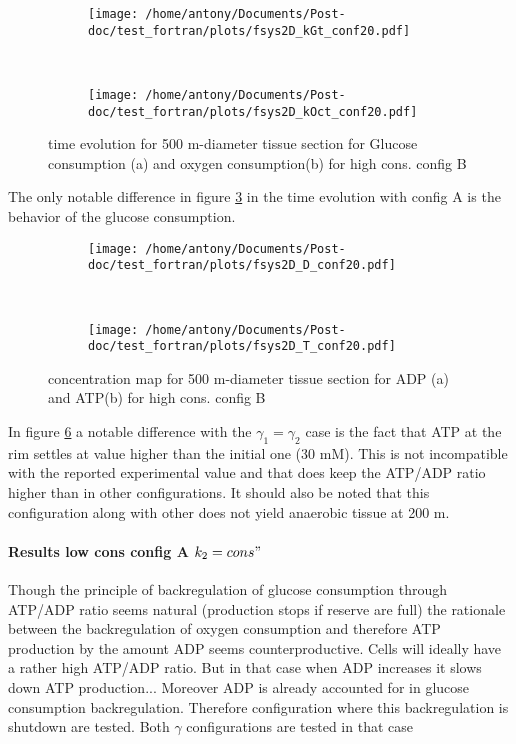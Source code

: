 \documentclass[11pt,a4paper]{article}
\begin{document}
\begin{figure}[ht!]
	\begin{subfigure}{0.45\textwidth}
	\centering
	\texttt{[image: /home/antony/Documents/Post-doc/test\_fortran/plots/fsys2D\_kGt\_conf20.pdf]}
	\caption{ \label{kGt_conf20}}
	\end{subfigure}
	~~
	\begin{subfigure}{0.45\textwidth}
	\texttt{[image: /home/antony/Documents/Post-doc/test\_fortran/plots/fsys2D\_kOct\_conf20.pdf]}
		\caption{ \label{kOct_conf20}}
	\end{subfigure}
	\caption{time evolution for 500 \textmu m-diameter tissue section  for Glucose consumption (a) and oxygen consumption(b) for high cons. config B \label{ktconf20}}
\end{figure} 

The only notable difference in figure \ref{ktconf20} in the time evolution with config A is the behavior of the glucose consumption. 

\begin{figure}[ht!]
	\begin{subfigure}{0.45\textwidth}
	\centering
	\texttt{[image: /home/antony/Documents/Post-doc/test\_fortran/plots/fsys2D\_D\_conf20.pdf]}
	\caption{ \label{D_conf20}}
	\end{subfigure}
	~~
	\begin{subfigure}{0.45\textwidth}
	\texttt{[image: /home/antony/Documents/Post-doc/test\_fortran/plots/fsys2D\_T\_conf20.pdf]}
		\caption{ \label{T_conf20}}
	\end{subfigure}
	\caption{concentration map for 500 \textmu m-diameter tissue section  for ADP (a) and ATP(b) for high cons. config B \label{DTconf20}}
\end{figure}

In figure \ref{DTconf20} a notable difference with the $\gamma_1 = \gamma_2$ case is the fact that ATP at the rim settles at value higher than the initial one (30 mM). This is not incompatible with the reported experimental value and that does keep the ATP/ADP ratio higher than in other configurations. It should also be noted that this configuration along with other does not yield anaerobic tissue at 200 \textmu m.

\paragraph{Results low cons config A $k_2 = cons"$}
Though the principle of backregulation of glucose consumption through ATP/ADP ratio seems natural (production stops if reserve are full) the rationale between the backregulation of oxygen consumption and therefore ATP production by the amount ADP seems counterproductive. Cells will ideally have a rather high ATP/ADP ratio. But in that case when ADP increases it slows down ATP production... Moreover ADP is already accounted for in glucose consumption backregulation. Therefore configuration where this backregulation is shutdown are tested. Both $\gamma$ configurations are tested in that case
\end{document}
